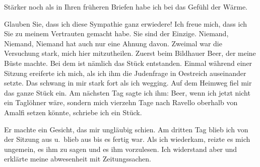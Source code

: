\pstart
           Stärker noch als in Ihren früheren
              Briefen habe ich bei \label{K_L03845-1v}\label{K_L03845-1} das Gefühl der Wärme.\pend
           
\pstart
           Glauben Sie, dass ich diese Sympathie
      ganz erwiedere! Ich freue mich, dass
      ich Sie zu meinem Vertrauten gemacht
      habe. Sie sind der Einzige. Niemand,
      Niemand, Niemand hat auch nur eine
      Ahnung davon. Zweimal war die Versuchung stark, mich hier mitzutheilen.
      Zuerst beim Bildhauer Beer, der meine
               Büste machte. Bei dem ist nämlich das
               Stück entstanden. Einmal während einer
      Sitzung ereiferte ich mich, als ich ihm
      die Judenfrage in Oestreich auseinander
      setzte. Das schwang in mir stark fort
      als ich wegging. Auf dem Heimweg fiel
      mir das ganze Stück ein. Am nächsten
               Tag sagte ich ihm: Beer, wenn ich jetzt
      nicht ein Taglöhner wäre, sondern mich
      vierzehn Tage nach Ravello oberhalb von
               Amalfi setzen könnte, schriebe ich ein {\pb}Stück.\pend
           
\pstart
           Er machte ein Gesicht, das mir ungläubig
      schien. Am dritten Tag blieb ich von
      der Sitzung aus u. blieb aus bis es
      fertig war. Als ich wiederkam, reizte
      es mich ungemein, es ihm zu sagen
      und es ihm vorzulesen. Ich widerstand
      aber und erklärte meine abwesenheit
      mit Zeitungssachen.\pend
           

